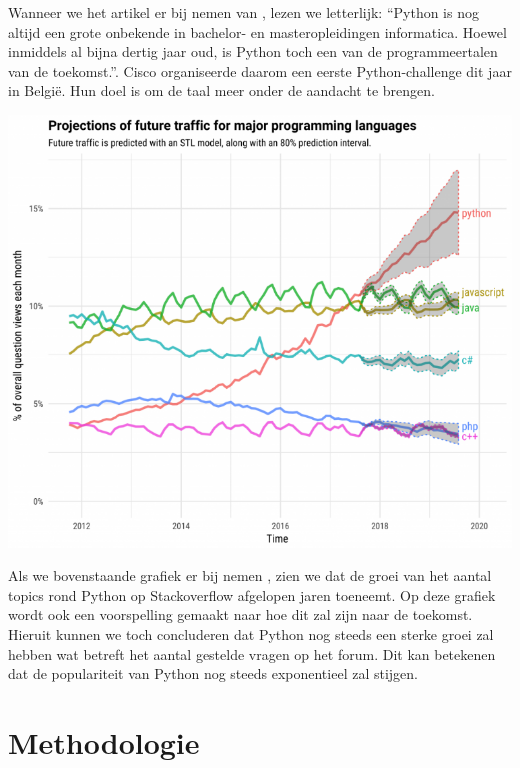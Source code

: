 Wanneer we het artikel er bij nemen van \textcite{Cisco2018}, lezen we letterlijk: “Python is nog altijd een grote onbekende in bachelor- en masteropleidingen informatica. Hoewel inmiddels al bijna dertig jaar oud, is Python toch een van de programmeertalen van de toekomst.”. Cisco organiseerde daarom een eerste Python-challenge dit jaar in België. Hun doel is om de taal meer onder de aandacht te brengen. 

\includegraphics{graph.png}

Als we bovenstaande grafiek er bij nemen \autocite{SO2017}, zien we dat de groei van het aantal topics rond Python op Stackoverflow afgelopen jaren toeneemt. Op deze grafiek wordt ook een voorspelling gemaakt naar hoe dit zal zijn naar de toekomst. Hieruit kunnen we toch concluderen dat Python nog steeds een sterke groei zal hebben wat betreft het aantal gestelde vragen op het forum. Dit kan betekenen dat de populariteit van Python nog steeds exponentieel zal stijgen. 






\section{Methodologie}
\label{sec:methodologie}

